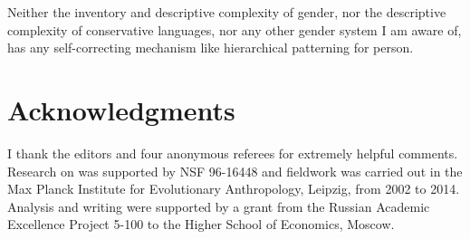 \documentclass[output=collectionpaper]{langsci/langscibook}
\begin{document}
Neither the inventory and descriptive complexity of  gender, nor the descriptive complexity of conservative  languages, nor any other gender system I am aware of, has any self-correcting mechanism like hierarchical patterning for person.


\section*{Acknowledgments}
I thank the editors and four anonymous referees for extremely helpful comments. Research on  was supported by NSF 96-16448 and  fieldwork was carried out in the Max Planck Institute for Evolutionary Anthropology, Leipzig, from 2002 to 2014. Analysis and writing were supported by a grant from the Russian Academic Excellence Project 5-100 to the Higher School of Economics, Moscow.

\sloppy
\printbibliography[heading=subbibliography,notkeyword=this]
\end{document}
